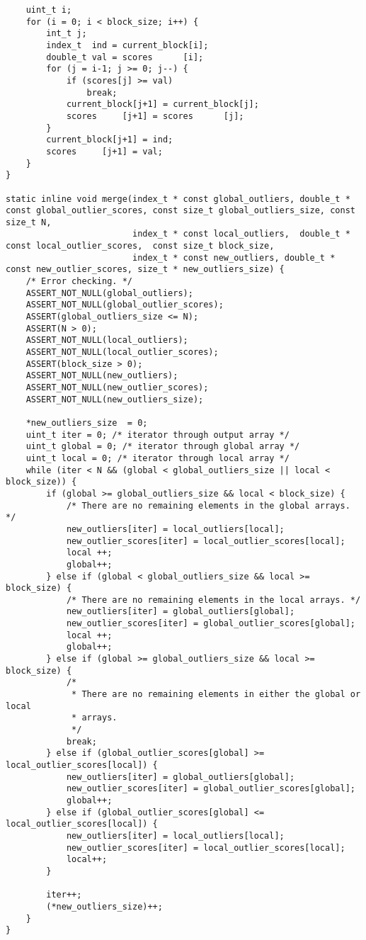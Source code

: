 \begin{lstlisting}
	uint_t i;
	for (i = 0; i < block_size; i++) {
		int_t j;
		index_t  ind = current_block[i];
		double_t val = scores	   [i];
		for (j = i-1; j >= 0; j--) {
			if (scores[j] >= val)
				break;
			current_block[j+1] = current_block[j];
			scores	   [j+1] = scores	   [j];
		}
		current_block[j+1] = ind;
		scores	   [j+1] = val;
	}
}

static inline void merge(index_t * const global_outliers, double_t * const global_outlier_scores, const size_t global_outliers_size, const size_t N,
						 index_t * const local_outliers,  double_t * const local_outlier_scores,  const size_t block_size,
						 index_t * const new_outliers, double_t * const new_outlier_scores, size_t * new_outliers_size) {
	/* Error checking. */
	ASSERT_NOT_NULL(global_outliers);
	ASSERT_NOT_NULL(global_outlier_scores);
	ASSERT(global_outliers_size <= N);
	ASSERT(N > 0);
	ASSERT_NOT_NULL(local_outliers);
	ASSERT_NOT_NULL(local_outlier_scores);
	ASSERT(block_size > 0);
	ASSERT_NOT_NULL(new_outliers);
	ASSERT_NOT_NULL(new_outlier_scores);
	ASSERT_NOT_NULL(new_outliers_size);
	
	*new_outliers_size  = 0;
	uint_t iter = 0; /* iterator through output array */
	uint_t global = 0; /* iterator through global array */
	uint_t local = 0; /* iterator through local array */
	while (iter < N && (global < global_outliers_size || local < block_size)) {
		if (global >= global_outliers_size && local < block_size) {
			/* There are no remaining elements in the global arrays. */
			new_outliers[iter] = local_outliers[local];
			new_outlier_scores[iter] = local_outlier_scores[local];
			local ++;
			global++;
		} else if (global < global_outliers_size && local >= block_size) {
			/* There are no remaining elements in the local arrays. */
			new_outliers[iter] = global_outliers[global];
			new_outlier_scores[iter] = global_outlier_scores[global];
			local ++;
			global++;
		} else if (global >= global_outliers_size && local >= block_size) {
			/*
			 * There are no remaining elements in either the global or local 
			 * arrays.
			 */
			break;
		} else if (global_outlier_scores[global] >= local_outlier_scores[local]) {
			new_outliers[iter] = global_outliers[global];
			new_outlier_scores[iter] = global_outlier_scores[global];
			global++;
		} else if (global_outlier_scores[global] <= local_outlier_scores[local]) {
			new_outliers[iter] = local_outliers[local];
			new_outlier_scores[iter] = local_outlier_scores[local];
			local++;
		}
		
		iter++;
		(*new_outliers_size)++;
	}
}


\end{lstlisting}
